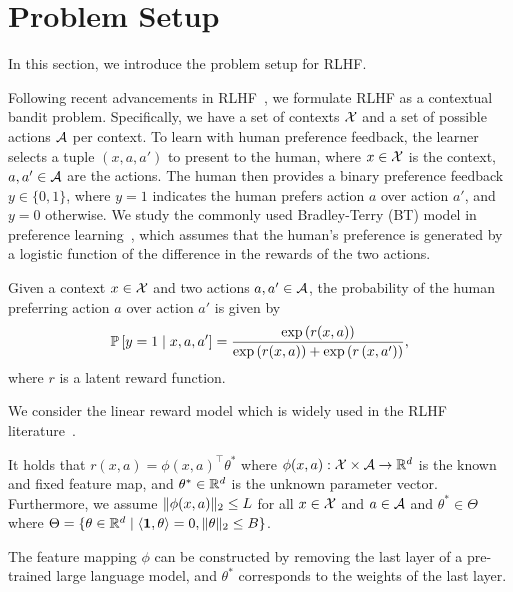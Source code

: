 \section{Problem Setup}
\label{sec:setup}

In this section, we introduce the problem setup for RLHF.

Following recent advancements in RLHF~\citep{ICML'23:Zhu-Principled,ICML'24:Xiong-Iterative}, we formulate RLHF as a contextual bandit problem. Specifically, we have a set of contexts $\X$ and a set of possible actions $\A$ per context. To learn with human preference feedback, the learner selects a tuple $(x, a, a')$ to present to the human, where $x \in \X$ is the context, $a, a' \in \A$ are the actions. The human then provides a binary preference feedback $y \in \{0, 1\}$, where $y = 1$ indicates the human prefers action $a$ over action $a'$, and $y = 0$ otherwise. We study the commonly used Bradley-Terry (BT) model in preference learning~\citep{BT-model}, which assumes that the human's preference is generated by a logistic function of the difference in the rewards of the two actions.
\begin{myDef}
    \label{def:BT}
    Given a context $x \in \X$ and two actions $a, a' \in \A$, the probability of the human preferring action $a$ over action $a'$ is given by
    \begin{equation*}
        \P\left[y=1 \mid x, a, a^{\prime}\right]=\frac{\exp \left(r(x, a)\right)}{\exp \left(r(x, a)\right)+\exp \left(r\left(x, a^{\prime}\right)\right)},
    \end{equation*}
    where $r$ is a latent reward function.
\end{myDef}
We consider the linear reward model which is widely used in the RLHF literature~\citep{ICML'23:Zhu-Principled,arXiv'24:Ji-RLHF-active,arXiv'24:Das-RLHF-active}. 
\begin{myAssumption}
    \label{asm:linear-reward}
    It holds that $r(x, a) = \phi(x, a)^\top \theta^*$ where $\phi(x, a): \X \times \A \to \R^d$ is the known and fixed feature map, and $\theta^* \in \R^d$ is the unknown parameter vector. Furthermore, we assume $\norm{\phi(x, a)}_2 \leq L$ for all $x \in \X$ and $a \in \A$ and $\theta^* \in \Theta$ where $\Theta = \{\theta \in \R^d \mid \langle \bm{1}, \theta \rangle = 0, \|\theta\|_2 \leq B\}$.
\end{myAssumption}
\begin{myRemark}
    The feature mapping $\phi$ can be constructed by removing the last layer of a pre-trained large language model, and $\theta^*$ corresponds to the weights of the last layer. 
\end{myRemark}

